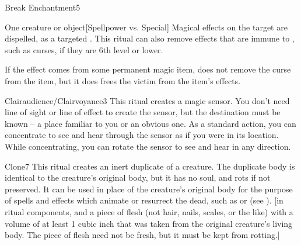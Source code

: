 \begin{spellsection}{Break Enchantment}{5}
\spellrng{\rngclose}
\begin{spelltarget}{One creature or object}[Spellpower vs. Special]
    \spelleffect Magical effects on the target are dispelled, as a targeted . This ritual can also remove effects that are immune to , such as curses, if they are 6th level or lower.
\end{spelltarget}
\par If the effect comes from some permanent magic item,  does not remove the curse from the item, but it does frees the victim from the item's effects.
\end{spellsection}

\begin{spellsection}{Clairaudience/Clairvoyance}{3}
\spellrng{\rngext \rngunrestricted}
\spelldur \durmed \dismissable
\spellline
\spelleffect This ritual creates a magic sensor. You don't need line of sight or line of effect to create the sensor, but the destination must be known -- a place familiar to you or an obvious one. As a standard action, you can concentrate to see and hear through the sensor as if you were in its location. While concentrating, you can rotate the sensor to see and hear in any direction.
\spellnotes \sensorspellnotes
{}
\end{spellsection}

\begin{spellsection}{Clone}{7}
\spelleffect This ritual creates an inert duplicate of a creature. The duplicate body is identical to the creature's original body, but it has no soul, and rots if not preserved. It can be used in place of the creature's original body for the purpose of spells and effects which animate or resurrect the dead, such as  or  (see ).
[in ritual components, and a piece of flesh (not hair, nails, scales, or the like) with a volume of at least 1 cubic inch that was taken from the original creature's living body. The piece of flesh need not be fresh, but it must be kept from rotting.]
\end{spellsection}

